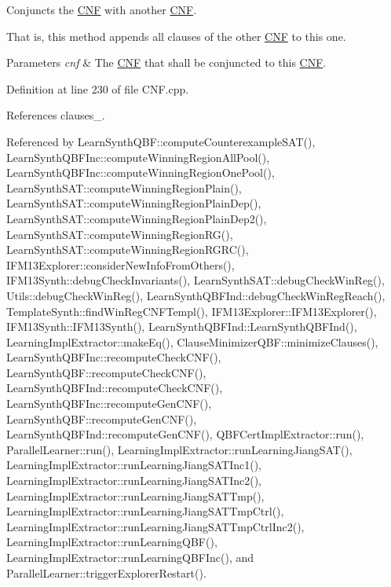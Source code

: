 Conjuncts the \hyperlink{classCNF}{C\-N\-F} with another \hyperlink{classCNF}{C\-N\-F}. 

That is, this method appends all clauses of the other \hyperlink{classCNF}{C\-N\-F} to this one.


\begin{DoxyParams}{Parameters}
{\em cnf} & The \hyperlink{classCNF}{C\-N\-F} that shall be conjuncted to this \hyperlink{classCNF}{C\-N\-F}. \\
\hline
\end{DoxyParams}


Definition at line 230 of file C\-N\-F.\-cpp.



References clauses\-\_\-.



Referenced by Learn\-Synth\-Q\-B\-F\-::compute\-Counterexample\-S\-A\-T(), Learn\-Synth\-Q\-B\-F\-Inc\-::compute\-Winning\-Region\-All\-Pool(), Learn\-Synth\-Q\-B\-F\-Inc\-::compute\-Winning\-Region\-One\-Pool(), Learn\-Synth\-S\-A\-T\-::compute\-Winning\-Region\-Plain(), Learn\-Synth\-S\-A\-T\-::compute\-Winning\-Region\-Plain\-Dep(), Learn\-Synth\-S\-A\-T\-::compute\-Winning\-Region\-Plain\-Dep2(), Learn\-Synth\-S\-A\-T\-::compute\-Winning\-Region\-R\-G(), Learn\-Synth\-S\-A\-T\-::compute\-Winning\-Region\-R\-G\-R\-C(), I\-F\-M13\-Explorer\-::consider\-New\-Info\-From\-Others(), I\-F\-M13\-Synth\-::debug\-Check\-Invariants(), Learn\-Synth\-S\-A\-T\-::debug\-Check\-Win\-Reg(), Utils\-::debug\-Check\-Win\-Reg(), Learn\-Synth\-Q\-B\-F\-Ind\-::debug\-Check\-Win\-Reg\-Reach(), Template\-Synth\-::find\-Win\-Reg\-C\-N\-F\-Templ(), I\-F\-M13\-Explorer\-::\-I\-F\-M13\-Explorer(), I\-F\-M13\-Synth\-::\-I\-F\-M13\-Synth(), Learn\-Synth\-Q\-B\-F\-Ind\-::\-Learn\-Synth\-Q\-B\-F\-Ind(), Learning\-Impl\-Extractor\-::make\-Eq(), Clause\-Minimizer\-Q\-B\-F\-::minimize\-Clauses(), Learn\-Synth\-Q\-B\-F\-Inc\-::recompute\-Check\-C\-N\-F(), Learn\-Synth\-Q\-B\-F\-::recompute\-Check\-C\-N\-F(), Learn\-Synth\-Q\-B\-F\-Ind\-::recompute\-Check\-C\-N\-F(), Learn\-Synth\-Q\-B\-F\-Inc\-::recompute\-Gen\-C\-N\-F(), Learn\-Synth\-Q\-B\-F\-::recompute\-Gen\-C\-N\-F(), Learn\-Synth\-Q\-B\-F\-Ind\-::recompute\-Gen\-C\-N\-F(), Q\-B\-F\-Cert\-Impl\-Extractor\-::run(), Parallel\-Learner\-::run(), Learning\-Impl\-Extractor\-::run\-Learning\-Jiang\-S\-A\-T(), Learning\-Impl\-Extractor\-::run\-Learning\-Jiang\-S\-A\-T\-Inc1(), Learning\-Impl\-Extractor\-::run\-Learning\-Jiang\-S\-A\-T\-Inc2(), Learning\-Impl\-Extractor\-::run\-Learning\-Jiang\-S\-A\-T\-Tmp(), Learning\-Impl\-Extractor\-::run\-Learning\-Jiang\-S\-A\-T\-Tmp\-Ctrl(), Learning\-Impl\-Extractor\-::run\-Learning\-Jiang\-S\-A\-T\-Tmp\-Ctrl\-Inc2(), Learning\-Impl\-Extractor\-::run\-Learning\-Q\-B\-F(), Learning\-Impl\-Extractor\-::run\-Learning\-Q\-B\-F\-Inc(), and Parallel\-Learner\-::trigger\-Explorer\-Restart().

